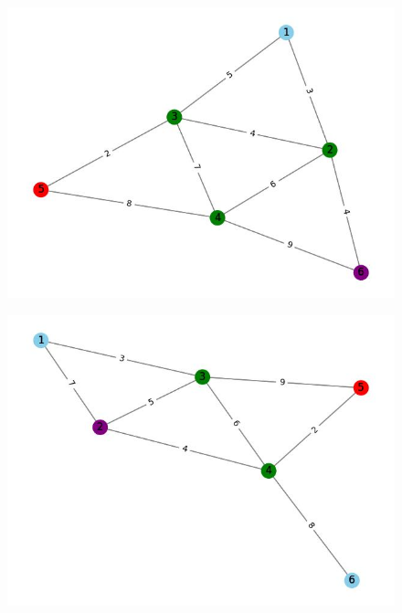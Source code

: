 \documentclass{article}
\begin{document}
\begin{figure}
    \centering
    \includegraphics[width=1\linewidth]{6.jpg}
    \label{fig:enter-label}
\end{figure}

\begin{figure}
    \centering
    \includegraphics[width=1\linewidth]{7.jpg}
    \label{fig:enter-label}
\end{figure}
\end{document}
